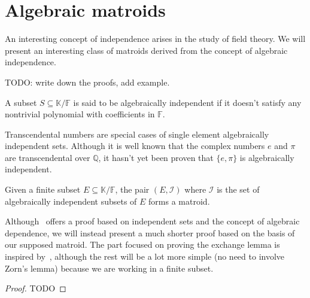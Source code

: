 \section{Algebraic matroids}

An interesting concept of independence arises in the study of field theory. We will present an interesting class of matroids derived from the concept of algebraic independence. 

TODO: write down the proofs, add example.

\begin{defn}
    A subset $S \subseteq \mathbb K / \mathbb F$ is said to be algebraically independent if it doesn't satisfy any nontrivial polynomial with coefficients in $\mathbb F$.
\end{defn}

Transcendental numbers are special cases of single element algebraically independent sets. Although it is well known that the complex numbers $e$ and $\pi$ are transcendental over $\mathbb{Q} $, it hasn't yet been proven that $\{e, \pi \}$ is algebraically independent.

\begin{theorem}
    Given a finite subset $E \subseteq \mathbb K / \mathbb F$, the pair $(E, \mathcal I)$  where $\mathcal I$ is the set of algebraically independent subsets of $E$ forms a matroid.
\end{theorem}

    Although~\cite{oxley1} offers a proof based on independent sets and the concept of algebraic dependence, we will instead present a much shorter proof based on the basis of our supposed matroid. The part focused on proving the exchange lemma is inspired by~\cite{milne2022}, although the rest will be a lot more simple (no need to involve Zorn's lemma) because we are working in a finite subset.

\begin{proof}
    TODO
\end{proof}
